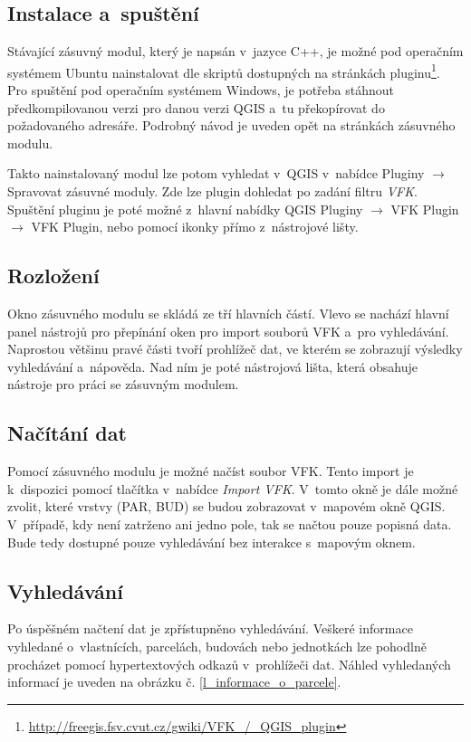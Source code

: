 \documentclass[a4paper,12pt,oneside]{book}
\begin{document}
\subsection{Instalace a~spuštění}
Stávající zásuvný modul, který je napsán v~jazyce C++, je možné pod
operačním systémem Ubuntu nainstalovat dle skriptů dostupných na
stránkách
pluginu\footnote{\url{http://freegis.fsv.cvut.cz/gwiki/VFK\_/\_QGIS\_plugin}}. Pro
spuštění pod operačním systémem Windows, je potřeba stáhnout
předkompilovanou verzi pro danou verzi QGIS a~tu překopírovat do
požadovaného adresáře. Podrobný návod je uveden opět na stránkách
zásuvného modulu.

Takto nainstalovaný modul lze potom vyhledat v~QGIS v~nabídce Pluginy
$\rightarrow$ Spravovat zásuvné moduly. Zde lze plugin dohledat po
zadání filtru \textit{VFK}. Spuštění pluginu je poté možné z~hlavní
nabídky QGIS Pluginy $\rightarrow$ VFK Plugin $\rightarrow$ VFK
Plugin, nebo pomocí ikonky přímo z~nástrojové lišty.

\subsection{Rozložení}
Okno zásuvného modulu se skládá ze tří hlavních částí. Vlevo se
nachází hlavní panel nástrojů pro přepínání oken pro import souborů
VFK a~pro vyhledávání. Naprostou většinu pravé části tvoří prohlížeč
dat, ve kterém se zobrazují výsledky vyhledávání a~nápověda. Nad ním
je poté nástrojová lišta, která obsahuje nástroje pro práci se
zásuvným modulem.

\subsection{Načítání dat}
Pomocí zásuvného modulu je možné načíst soubor VFK. Tento import je
k~dispozici pomocí tlačítka  v~nabídce \textit{Import
  VFK}. V~tomto okně je dále možné zvolit, které vrstvy (PAR, BUD) se budou
zobrazovat v~mapovém okně QGIS. V~případě, kdy není zatrženo ani jedno pole,
tak se načtou pouze popisná data. Bude tedy dostupné pouze vyhledávání
bez interakce s~mapovým oknem.

\subsection{Vyhledávání}
Po úspěšném načtení dat je zpřístupněno vyhledávání. Veškeré informace
vyhledané o~vlastnících, parcelách, budovách nebo jednotkách lze
pohodlně procházet pomocí hypertextových odkazů v~prohlížeči
dat. Náhled vyhledaných informací je uveden na obrázku
č. \ref{l_informace_o_parcele}.
\end{document}
